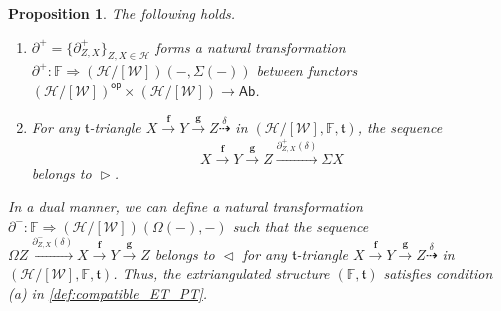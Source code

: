 \documentclass[a4paper,reqno,10pt]{amsart}
\newtheorem{proposition}[proposition]{Proposition}
\theoremstyle{definition}
\theoremstyle{definition}
\theoremstyle{definition}
\theoremstyle{definition}
\theoremstyle{plain}
\def\Ab{\mathsf{Ab}}
\newcommand{\op}{\mathsf{op}}
\newcommand{\ft}{\mathfrak{t}}
\newcommand{\BF}{\mathbb{F}}
\newcommand{\CH}{\mathcal{H}}
\newcommand{\CW}{\mathcal{W}}
\begin{document}
\begin{proposition}\label{prop:construction_of_dell}
The following holds.
\begin{enumerate}
\item $\partial^+=\{\partial^+_{Z,X}\}_{Z,X\in\CH}$
forms a natural transformation $\partial^+\colon \BF\Rightarrow (\CH/[\CW])(-,\Sigma(-))$ between functors $(\CH/[\CW])^\op\times(\CH/[\CW])\to\Ab$.
\item For any $\ft$-triangle $X\xrightarrow{\mathbf{f}}Y\xrightarrow{\mathbf{g}}Z\overset{\delta}{\dashrightarrow}$ in $(\CH/[\CW],\BF,\ft)$, the sequence
\begin{equation}\label{sequence_to_belong_rtri}
X\xrightarrow{\mathbf{f}}Y\xrightarrow{\mathbf{g}}Z\xrightarrow{\partial^+_{Z,X}(\delta)}\Sigma X
\end{equation}
belongs to $\vartriangleright$.
\end{enumerate}

In a dual manner, we can define a natural transformation $\partial^-\colon \BF\Rightarrow (\CH/[\CW])(\Omega(-),-)$ such that the sequence
$\Omega Z\xrightarrow{\partial^-_{Z,X}(\delta)} X\xrightarrow{\mathbf{f}}Y\xrightarrow{\mathbf{g}}Z$
belongs to $\vartriangleleft$ for any $\ft$-triangle $X\xrightarrow{\mathbf{f}}Y\xrightarrow{\mathbf{g}}Z\overset{\delta}{\dashrightarrow}$ in $(\CH/[\CW],\BF,\ft)$.
Thus, the extriangulated structure $(\BF,\ft)$ 
\color{blue}
satisfies condition {\rm (a)} in \cref{def:compatible_ET_PT}.
\normalcolor
\end{proposition}
\end{document}
